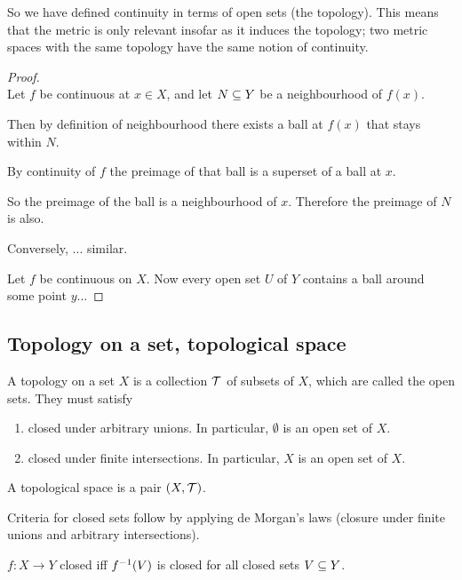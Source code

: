 \begin{remark*}
  So we have defined continuity in terms of open sets (the topology). This means that the metric is
  only relevant insofar as it induces the topology; two metric spaces with the same topology have
  the same notion of continuity.
\end{remark*}

\begin{proof}~\\
  Let $f$ be continuous at $x \in X$, and let $N \subseteq Y$ be a neighbourhood of $f(x)$.

  Then by definition of neighbourhood there exists a ball at $f(x)$ that stays within $N$.

  By continuity of $f$ the preimage of that ball is a superset of a ball at $x$.

  So the preimage of the ball is a neighbourhood of $x$. Therefore the preimage of $N$ is also.

  Conversely, ... similar.

  Let $f$ be continuous on $X$. Now every open set $U$ of $Y$ contains a ball around some point $y$...
\end{proof}

\subsection{Topology on a set, topological space}
\begin{definition}
  A topology on a set $X$ is a collection $\mathcal T$ of subsets of $X$, which are called the open
  sets. They must satisfy
  \begin{enumerate}
  \item closed under arbitrary unions. In particular, $\emptyset$ is an open set of $X$.
  \item closed under finite intersections. In particular, $X$ is an open set of $X$.
  \end{enumerate}
  A topological space is a pair $(X, \mathcal T)$.
\end{definition}

\begin{remark*}
  Criteria for closed sets follow by applying de Morgan's laws (closure under finite unions and
  arbitrary intersections).

  $f:X\to Y$ closed iff $f^{-1}(V)$ is closed for all closed sets $V \subseteq Y$.
\end{remark*}

